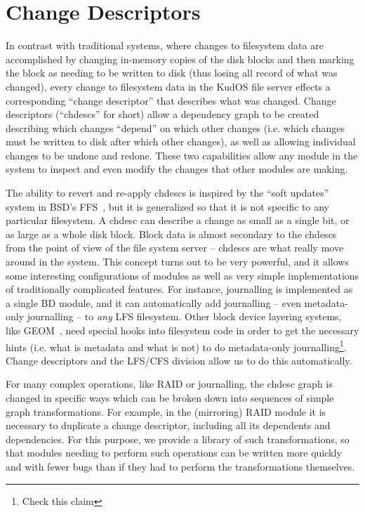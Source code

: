 \section{Change Descriptors}
\label{sec:chdescs}

In contrast with traditional systems, where changes to filesystem data are
accomplished by changing in-memory copies of the disk blocks and then marking
the block as needing to be written to disk (thus losing all record of what was
changed), every change to filesystem data in the KudOS file server effects a
corresponding ``change descriptor'' that describes what was changed. Change
descriptors (``chdescs'' for short) allow a dependency graph to be created
describing which changes ``depend'' on which other changes (i.e. which changes
must be written to disk after which other changes), as well as allowing
individual changes to be undone and redone. These two capabilities allow any
module in the system to inspect and even modify the changes that other modules
are making.

The ability to revert and re-apply chdescs is inspired by the ``soft updates''
system in BSD's FFS~\cite{ganger00soft}, but it is generalized so that it is not
specific to any particular filesystem. A chdesc can describe a change as small
as a single bit, or as large as a whole disk block. Block data is almost
secondary to the chdescs from the point of view of the file system server --
chdescs are what really move around in the system. This concept turns out to be
very powerful, and it allows some interesting configurations of modules as well
as very simple implementations of traditionally complicated features. For
instance, journalling is implemented as a single BD module, and it can
automatically add journalling -- even metadata-only journalling -- to {\it any}
LFS filesystem. Other block device layering systems, like GEOM~\cite{geom}, need
special hooks into filesystem code in order to get the necessary hints (i.e.
what is metadata and what is not) to do metadata-only journalling\footnote{Check
this claim}. Change descriptors and the LFS/CFS division allow us to do this
automatically.

For many complex operations, like RAID or journalling, the chdesc graph is
changed in specific ways which can be broken down into sequences of simple graph
transformations. For example, in the (mirroring) RAID module it is necessary to
duplicate a change descriptor, including all its dependents and dependencies.
For this purpose, we provide a library of such transformations, so that modules
needing to perform such operations can be written more quickly and with fewer
bugs than if they had to perform the transformations themselves.
